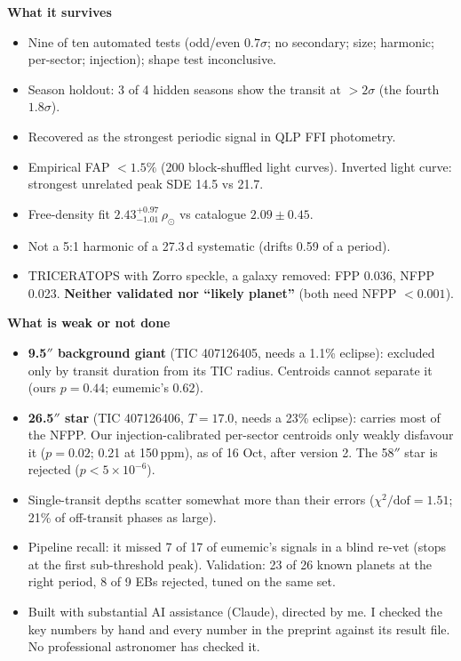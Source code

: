 \documentclass[10pt]{article}
\begin{document}
\begin{minipage}[t]{0.49\textwidth}
\textbf{What it survives}
\begin{itemize}
\item Nine of ten automated tests (odd/even $0.7\sigma$; no secondary; size; harmonic; per-sector; injection); shape test inconclusive.
\item Season holdout: 3 of 4 hidden seasons show the transit at $>2\sigma$ (the fourth $1.8\sigma$).
\item Recovered as the strongest periodic signal in QLP FFI photometry.
\item Empirical FAP $<1.5\%$ (200 block-shuffled light curves). Inverted light curve: strongest unrelated peak SDE 14.5 vs 21.7.
\item Free-density fit $2.43^{+0.97}_{-1.01}\,\rho_\odot$ vs catalogue $2.09 \pm 0.45$.
\item Not a 5:1 harmonic of a 27.3\,d systematic (drifts 0.59 of a period).
\item TRICERATOPS with Zorro speckle, a galaxy removed: FPP 0.036, NFPP 0.023. \textbf{Neither validated nor ``likely planet''} (both need NFPP $<0.001$).
\end{itemize}
\end{minipage}\hfill
\begin{minipage}[t]{0.49\textwidth}
\textbf{What is weak or not done}
\begin{itemize}
\item \textbf{9.5$''$ background giant} (TIC 407126405, needs a 1.1\% eclipse): excluded only by transit duration from its TIC radius. Centroids cannot separate it (ours $p=0.44$; eumemic's $0.62$).
\item \textbf{26.5$''$ star} (TIC 407126406, $T=17.0$, needs a 23\% eclipse): carries most of the NFPP. Our injection-calibrated per-sector centroids only weakly disfavour it ($p=0.02$; 0.21 at 150\,ppm), as of 16 Oct, after version 2. The 58$''$ star is rejected ($p<5\times10^{-6}$).
\item Single-transit depths scatter somewhat more than their errors ($\chi^2/\mathrm{dof}=1.51$; 21\% of off-transit phases as large).
\item Pipeline recall: it missed 7 of 17 of eumemic's signals in a blind re-vet (stops at the first sub-threshold peak). Validation: 23 of 26 known planets at the right period, 8 of 9 EBs rejected, tuned on the same set.
\item Built with substantial AI assistance (Claude), directed by me. I checked the key numbers by hand and every number in the preprint against its result file. No professional astronomer has checked it.
\end{itemize}
\end{minipage}
\end{document}
